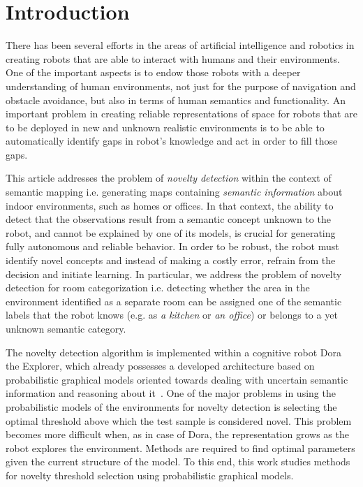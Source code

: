 \documentclass[runningheads,a4paper]{llncs}
\begin{document}
\section{Introduction}

There has been several efforts in the areas of artificial intelligence and robotics
in creating robots that are able to interact with humans and their environments.
One of the important aspects is to endow those robots with a deeper understanding
of human environments, not just for the purpose of navigation and obstacle avoidance, 
but also in terms of human semantics and functionality. An important problem
in creating reliable representations of space for robots that are to be deployed 
in new and unknown realistic environments is to be able to automatically 
identify gaps in robot's knowledge and act in order to fill those gaps. 

This article addresses the problem of \emph{novelty detection} within the context
of semantic mapping i.e. generating maps containing \emph{semantic information} 
about indoor environments, such as homes or offices. In that context, the ability 
to detect that the observations result from a semantic concept unknown to the robot, 
and cannot be explained by one of its models, is crucial for generating fully autonomous
and reliable behavior. In order to be robust, the robot must identify 
novel concepts and instead of making a costly error, refrain from the decision
and initiate learning. In particular, we address the problem of novelty detection for
room categorization i.e. detecting whether the area in the environment identified as a
separate room can be assigned one of the semantic labels that the robot knows (e.g. as \emph{a kitchen} 
or \emph{an office}) or belongs to a yet unknown semantic category.


The novelty detection algorithm is implemented within a cognitive robot Dora the Explorer,
which already possesses a developed architecture based on probabilistic graphical models 
oriented towards dealing with uncertain semantic information and reasoning about it~\cite{ijcai}.
One of the major problems in using the probabilistic models of the environments for novelty
detection is selecting the optimal threshold above which the test sample is considered
novel. This problem becomes more difficult when, as in case of Dora, the representation
grows as the robot explores the environment. Methods are required to find
optimal parameters given the current structure of the model. To this end, this work 
studies methods for novelty threshold selection using probabilistic graphical models.
\end{document}
